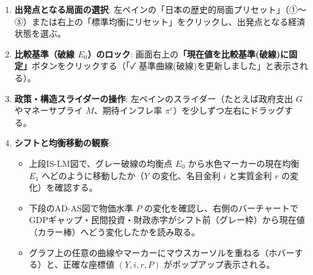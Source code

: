 \documentclass[lualatex,a4paper,11pt,ja=standard]{bxjsarticle}
\begin{document}
\begin{tcolorbox}[enhanced,colback=simslate!5!white,colframe=simslate!75!black,title={\textbf{【基本操作手順】政策変更前後の比較静学（4ステップ）}},fonttitle=\bfseries,arc=1.5mm]
\begin{enumerate}[label=\textbf{Step \arabic*.},leftmargin=16mm,itemsep=1.5mm]
  \item \textbf{出発点となる局面の選択}: 左ペインの「日本の歴史的局面プリセット」（①〜③）または右上の「標準均衡にリセット」をクリックし、出発点となる経済状態を選ぶ。
  \item \textbf{比較基準（破線 $E_0$）のロック}: 画面右上の\textbf{「現在値を比較基準(破線)に固定」}ボタンをクリックする（「✓ 基準曲線(破線)を更新しました」と表示される）。
  \item \textbf{政策・構造スライダーの操作}: 左ペインのスライダー（たとえば政府支出 $G$ やマネーサプライ $M$、期待インフレ率 $\pi^e$）を少しずつ左右にドラッグする。
  \item \textbf{シフトと均衡移動の観察}:
  \begin{itemize}[leftmargin=5mm,noitemsep]
    \item 上段IS-LM図で、グレー破線の均衡点 $E_0$ から水色マーカーの現在均衡 $E_1$ へどのように移動したか（$Y$ の変化、名目金利 $i$ と実質金利 $r$ の変化）を確認する。
    \item 下段のAD-AS図で物価水準 $P$ の変化を確認し、右側のバーチャートでGDPギャップ・民間投資・財政赤字がシフト前（グレー枠）から現在値（カラー棒）へどう変化したかを読み取る。
    \item グラフ上の任意の曲線やマーカーにマウスカーソルを重ねる（ホバーする）と、正確な座標値 $(Y, i, r, P)$ がポップアップ表示される。
  \end{itemize}
\end{enumerate}
\end{tcolorbox}
\end{document}
